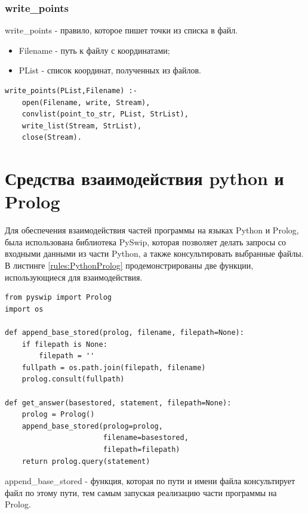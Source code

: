 \subsubsection{write\_points} 
\hspace{0.6cm} write\_points - правило, которое пишет точки из списка в файл.

\begin{itemize}
	\item Filename - путь к файлу с координатами;
	\item PList - список координат, полученных из файлов.
\end{itemize}

\begin{lstlisting}[caption=Реализация правила write\_points, label=rules:writepoints]
write_points(PList,Filename) :-
    open(Filename, write, Stream),
    convlist(point_to_str, PList, StrList),
	write_list(Stream, StrList),
    close(Stream).
\end{lstlisting}

\section{Средства взаимодействия python и Prolog}

\hspace{0.6cm} Для обеспечения взаимодействия частей программы на языках Python и Prolog, была использована библиотека PySwip, которая позволяет делать запросы со входными данными из части Python, а также консультировать выбранные файлы. В листинге \ref{rules:PythonProlog} продемонстрированы две функции, использующиеся для взаимодействия.

\begin{lstlisting}[caption=Взаимодействие python и Prolog, label=rules:PythonProlog]
from pyswip import Prolog
import os

def append_base_stored(prolog, filename, filepath=None):
    if filepath is None:
        filepath = ''    
    fullpath = os.path.join(filepath, filename)
    prolog.consult(fullpath)
    
def get_answer(basestored, statement, filepath=None):
    prolog = Prolog()
    append_base_stored(prolog=prolog, 
                       filename=basestored,
                       filepath=filepath)
    return prolog.query(statement)

\end{lstlisting}

\hspace{0.6cm} append\_base\_stored - функция, которая по пути и имени файла консультирует файл по этому пути, тем самым запуская реализацию части программы на Prolog.

